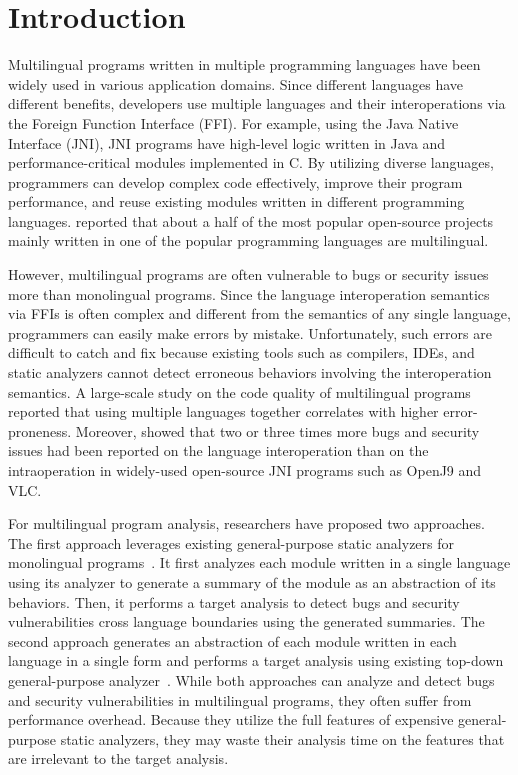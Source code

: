 \section{Introduction}
Multilingual programs written in multiple programming languages
have been widely used in various application domains.
Since different languages have different benefits,
developers use multiple languages and their interoperations
via the Foreign Function Interface (FFI). For example, using the Java Native Interface (JNI),
JNI programs have high-level logic written in Java and performance-critical
modules implemented in C. By utilizing diverse languages, programmers can
develop complex code effectively, improve their program performance,
and reuse existing modules written in different programming languages.
\citet{kochhar2016large} reported that about a half of the most popular open-source
projects mainly written in one of the popular programming languages are
multilingual.

However, multilingual programs are often vulnerable to bugs or security issues
more than monolingual programs. Since the language interoperation semantics
via FFIs is often complex and different from the semantics of any
single language, programmers can easily make errors by mistake.
Unfortunately, such errors are difficult to catch and fix because existing
tools such as compilers, IDEs, and static analyzers cannot detect erroneous
behaviors involving the interoperation semantics.
A large-scale study on the code quality of multilingual programs~\cite{kochhar2016large}
reported that using multiple languages together correlates with higher error-proneness.  
Moreover, \citet{grichi2020impact} showed that two or three times more
bugs and security issues had been reported on the language
interoperation than on the intraoperation in widely-used open-source JNI
programs such as OpenJ9 and VLC.

For multilingual program analysis, researchers have proposed two approaches.
The first approach leverages existing general-purpose static analyzers for monolingual
programs~\cite{JN-SAF, LeeASE20}.  It first analyzes each module
written in a single language using its analyzer to generate
a summary of the module as an abstraction of its behaviors.  Then, it performs a target
analysis to detect bugs and security vulnerabilities cross language boundaries
using the generated summaries. The second approach generates an abstraction
of each module written in each language in a single form and performs
a target analysis using existing top-down general-purpose analyzer~\cite{hybridroid, cpython}.
While both approaches can analyze and detect bugs and security vulnerabilities
in multilingual programs, they often suffer from performance overhead.
Because they utilize the full features of expensive general-purpose static analyzers,
they may waste their analysis time on the features that are irrelevant to
the target analysis.

